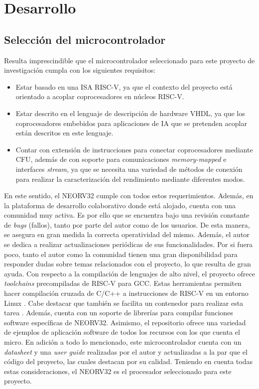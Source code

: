 \chapter{Desarrollo} %

\label{Desarrollo}

\section{Selección del microcontrolador}

\label{Selec}

Resulta imprescindible que el microcontrolador seleccionado para este proyecto de investigación cumpla con los siguientes requisitos:

\begin{itemize}
    \item Estar basado en una ISA RISC-V, ya que el contexto del proyecto está orientado a acoplar coprocesadores en núcleos RISC-V.
    \item Estar descrito en el lenguaje de descripción de hardware VHDL, ya que los coprocesadores embebidos para aplicaciones de IA que se pretenden acoplar están descritos en este lenguaje.
    \item Contar con extensión de instrucciones para conectar coprocesadores mediante CFU, además de con soporte para comunicaciones \textit{memory-mapped} e interfaces \textit{stream}, ya que se necesita una variedad de métodos de conexión para realizar la caracterización del rendimiento mediante diferentes modos.
\end{itemize} 

En este sentido, el NEORV32 \cite{gh:neorv32} cumple con todos estos requerimientos. 
Además, en la plataforma de desarrollo colaborativo donde está alojado, cuenta con una comunidad muy activa.
Es por ello que se encuentra bajo una revisión constante de \textit{bugs} (fallos), tanto por parte del autor como de los usuarios.
De esta manera, se asegura en gran medida la correcta operatividad del mismo.
Además, el autor se dedica a realizar actualizaciones periódicas de sus funcionalidades.
Por si fuera poco, tanto el autor como la comunidad tienen una gran disponibilidad para responder dudas sobre temas relacionados con el proyecto, lo que resulta de gran ayuda.
Con respecto a la compilación de lenguajes de alto nivel, el proyecto ofrece \textit{toolchains} precompiladas de RISC-V para GCC.  
Estas herramientas permiten hacer compilación cruzada de C/C++ a instrucciones de RISC-V  en un entorno Linux \cite{gh:neorv32-tool}.
Cabe destacar que también se facilita un contenedor para realizar esta tarea \cite{gh:sim-conatiner}. 
Además, cuenta con un soporte de librerías para compilar funciones software específicas de NEORV32. 
Asimismo, el repositorio ofrece una variedad de ejemplos de aplicación software de todos los recursos con los que cuenta el micro.
En adición a todo lo mencionado, este microcontrolador cuenta con un \textit{datasheet} \cite{neorv32-ds} y una \textit{user guide} \cite{neorv32-ug} realizadas por el autor y actualizadas a la par que el código del proyecto, las cuales destacan por su calidad.
Teniendo en cuenta todas estas consideraciones, el NEORV32 es el procesador seleccionado para este proyecto.

